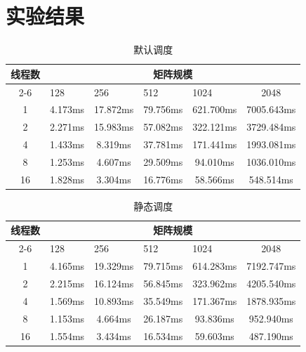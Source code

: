 \documentclass{SYSUReport}
\begin{document}
\section{实验结果}
\begin{table}[H]
\centering
\caption{默认调度}
\label{表1}
\begin{tabular}{|c|c|c|c|c|c|}
\hline
\multirow{2}{*}{线程数} & \multicolumn{5}{c|}{矩阵规模}                                                                        \\ \cline{2-6} 
 & \multicolumn{1}{l|}{128} & \multicolumn{1}{l|}{256} & \multicolumn{1}{l|}{512} & \multicolumn{1}{l|}{1024} & 2048 \\ \hline
1                    & 4.173ms & 17.872ms & 79.756ms & 621.700ms & 7005.643ms \\ \hline
2                    & 2.271ms & 15.983ms & 57.082ms & 322.121ms & 3729.484ms \\ \hline
4                    & 1.433ms & 8.319ms & 37.781ms & 171.441ms & 1993.081ms \\ \hline
8                    & 1.253ms & 4.607ms & 29.509ms & 94.010ms & 1036.010ms \\ \hline
16                   & 1.828ms & 3.304ms & 16.776ms & 58.566ms & 548.514ms \\ \hline
\end{tabular}
\end{table}

\begin{table}[H]
\centering
\caption{静态调度}
\label{表2}
\begin{tabular}{|c|c|c|c|c|c|}
\hline
\multirow{2}{*}{线程数} & \multicolumn{5}{c|}{矩阵规模}                                                                        \\ \cline{2-6} 
 & \multicolumn{1}{l|}{128} & \multicolumn{1}{l|}{256} & \multicolumn{1}{l|}{512} & \multicolumn{1}{l|}{1024} & 2048 \\ \hline
1                    & 4.165ms & 19.329ms & 79.715ms & 614.283ms & 7192.747ms \\ \hline
2                    & 2.215ms & 16.124ms & 56.845ms & 323.962ms & 4205.540ms \\ \hline
4                    & 1.569ms & 10.893ms & 35.549ms & 171.367ms & 1878.935ms \\ \hline
8                    & 1.153ms & 4.664ms & 26.187ms & 93.836ms & 952.940ms \\ \hline
16                   & 1.554ms & 3.434ms & 16.534ms & 59.603ms & 487.190ms \\ \hline
\end{tabular}
\end{table}
\end{document}
